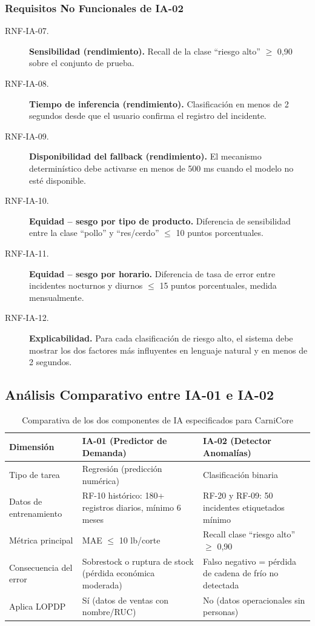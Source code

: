 \documentclass[11pt,a4paper]{article}
\begin{document}
\subsubsection{Requisitos No Funcionales de IA-02}

\begin{description}
  \item[RNF-IA-07.] \textbf{Sensibilidad (rendimiento).} Recall de la clase ``riesgo alto'' $\geq$ 0,90 sobre el conjunto de prueba.
  \item[RNF-IA-08.] \textbf{Tiempo de inferencia (rendimiento).} Clasificación en menos de 2 segundos desde que el usuario confirma el registro del incidente.
  \item[RNF-IA-09.] \textbf{Disponibilidad del fallback (rendimiento).} El mecanismo determinístico debe activarse en menos de 500 ms cuando el modelo no esté disponible.
  \item[RNF-IA-10.] \textbf{Equidad -- sesgo por tipo de producto.} Diferencia de sensibilidad entre la clase ``pollo'' y ``res/cerdo'' $\leq$ 10 puntos porcentuales.
  \item[RNF-IA-11.] \textbf{Equidad -- sesgo por horario.} Diferencia de tasa de error entre incidentes nocturnos y diurnos $\leq$ 15 puntos porcentuales, medida mensualmente.
  \item[RNF-IA-12.] \textbf{Explicabilidad.} Para cada clasificación de riesgo alto, el sistema debe mostrar los dos factores más influyentes en lenguaje natural y en menos de 2 segundos.
\end{description}

\subsection{Análisis Comparativo entre IA-01 e IA-02}

\begin{table}[H]
\centering
\begin{tabular}{|p{3.5cm}|p{5.5cm}|p{5.5cm}|}
\hline
\textbf{Dimensión} & \textbf{IA-01 (Predictor de Demanda)} & \textbf{IA-02 (Detector Anomalías)} \\
\hline
Tipo de tarea & Regresión (predicción numérica) & Clasificación binaria \\
\hline
Datos de entrenamiento & RF-10 histórico: 180+ registros diarios, mínimo 6 meses & RF-20 y RF-09: 50 incidentes etiquetados mínimo \\
\hline
Métrica principal & MAE $\leq$ 10 lb/corte & Recall clase ``riesgo alto'' $\geq$ 0,90 \\
\hline
Consecuencia del error & Sobrestock o ruptura de stock (pérdida económica moderada) & Falso negativo = pérdida de cadena de frío no detectada \\
\hline
Aplica LOPDP & Sí (datos de ventas con nombre/RUC) & No (datos operacionales sin personas) \\
\hline
\end{tabular}
\caption{Comparativa de los dos componentes de IA especificados para CarniCore}
\label{tab:comparativa_ia}
\end{table}
\end{document}
